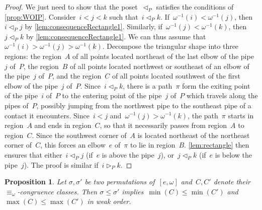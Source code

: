 \documentclass{amsart}
\newtheorem{proposition}[theorem]{Proposition}
\theoremstyle{definition}
\newcommand{\less}{\vartriangleleft} %
\newcommand{\more}{\vartriangleright} %
\newcommand{\contactLess}[1]{\less_{#1}} %
\newcommand{\contactMore}[1]{\more_{#1}} %
\begin{document}
\begin{proof}
We just need to show that the poset~$\contactLess{P}$ satisfies the conditions of \cref{prop:WOIP}.
Consider~$i < j < k$ such that~$i \contactLess{P} k$.
If~$\omega^{-1}(i) < \omega^{-1}(j)$, then~$i \contactLess{P} j$ by \cref{lem:consequenceRectangle1}.
Similarly, if~$\omega^{-1}(j) < \omega^{-1}(k)$, then~$j \contactLess{P} k$ by \cref{lem:consequenceRectangle1}.
We can thus assume that~${\omega^{-1}(i) > \omega^{-1}(j) > \omega^{-1}(k)}$.
Decompose the triangular shape into three regions: the region~$A$ of all points located northeast of the last elbow of the pipe~$j$ of~$P$, the region~$B$ of all points located northwest or southeast of an elbow of the pipe~$j$ of~$P$, and the region~$C$ of all points located southwest of the first elbow of the pipe~$j$ of~$P$.
Since~$i \contactLess{P} k$, there is a path~$\pi$ form the exiting point of the pipe~$i$ of~$P$ to the entering point of the pipe~$j$ of~$P$ which travels along the pipes of~$P$, possibly jumping from the northwest pipe to the southeast pipe of a contact it encounters.
Since~$i < j$ and~$\omega^{-1}(j) > \omega^{-1}(k)$, the path~$\pi$ starts in region~$A$ and ends in region~$C$, so that it necessarily passes from region~$A$ to region~$C$.
Since the southwest corner of~$A$ is located northeast of the northeast corner of~$C$, this forces an elbow~$e$ of~$\pi$ to lie in region~$B$.
\cref{lem:rectangle} then ensures that either~$i \contactLess{P} j$ (if~$e$ is above the pipe~$j$), or~$j \contactLess{P} k$ (if~$e$ is below the pipe~$j$).
The proof is similar if~$i \contactMore{P} k$.
\end{proof}

\begin{proposition}
\label{prop:orderPreserving}
Let $\sigma, \sigma'$ be two permutations of~$[e, \omega]$ and~$C, C'$ denote their $\equiv_\omega$-congruence classes.
Then $\sigma \le \sigma'$ implies~$\min(C) \le \min(C')$ and $\max(C) \le \max(C')$ in weak order.
\end{proposition}
\end{document}
